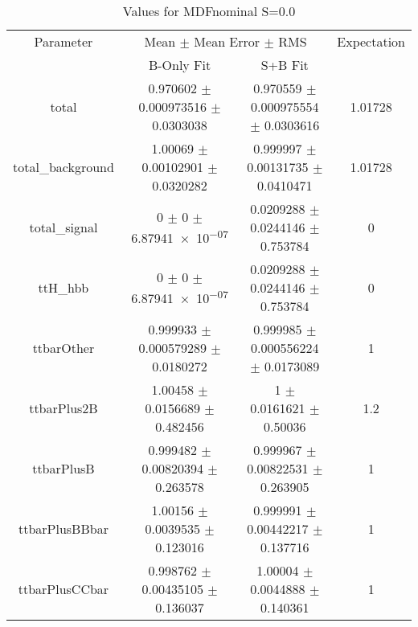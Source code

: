 \begin{table}
\centering
\caption{Values for MDFnominal S=0.0}
\begin{tabular}{cccc}
\toprule
Parameter & \multicolumn{2}{c}{Mean $\pm$ Mean Error $\pm$ RMS} & Expectation\\
 & B-Only Fit & S+B Fit & \\
\midrule
total & \num{0.970602} $\pm$ \num{0.000973516} $\pm$ \num{0.0303038} & \num{0.970559} $\pm$ \num{0.000975554} $\pm$ \num{0.0303616} & \num{1.01728}\\
total\_background & \num{1.00069} $\pm$ \num{0.00102901} $\pm$ \num{0.0320282} & \num{0.999997} $\pm$ \num{0.00131735} $\pm$ \num{0.0410471} & \num{1.01728}\\
total\_signal & \num{0} $\pm$ \num{0} $\pm$ \num{6.87941e-07} & \num{0.0209288} $\pm$ \num{0.0244146} $\pm$ \num{0.753784} & \num{0}\\
ttH\_hbb & \num{0} $\pm$ \num{0} $\pm$ \num{6.87941e-07} & \num{0.0209288} $\pm$ \num{0.0244146} $\pm$ \num{0.753784} & \num{0}\\
ttbarOther & \num{0.999933} $\pm$ \num{0.000579289} $\pm$ \num{0.0180272} & \num{0.999985} $\pm$ \num{0.000556224} $\pm$ \num{0.0173089} & \num{1}\\
ttbarPlus2B & \num{1.00458} $\pm$ \num{0.0156689} $\pm$ \num{0.482456} & \num{1} $\pm$ \num{0.0161621} $\pm$ \num{0.50036} & \num{1.2}\\
ttbarPlusB & \num{0.999482} $\pm$ \num{0.00820394} $\pm$ \num{0.263578} & \num{0.999967} $\pm$ \num{0.00822531} $\pm$ \num{0.263905} & \num{1}\\
ttbarPlusBBbar & \num{1.00156} $\pm$ \num{0.0039535} $\pm$ \num{0.123016} & \num{0.999991} $\pm$ \num{0.00442217} $\pm$ \num{0.137716} & \num{1}\\
ttbarPlusCCbar & \num{0.998762} $\pm$ \num{0.00435105} $\pm$ \num{0.136037} & \num{1.00004} $\pm$ \num{0.0044888} $\pm$ \num{0.140361} & \num{1}\\
\bottomrule
\end{tabular}
\end{table}